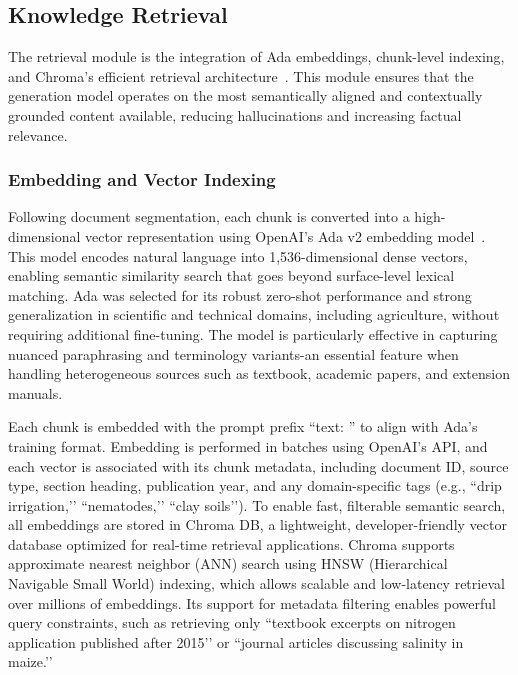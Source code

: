 \documentclass{ieeeaccess}
\begin{document}
\subsection{Knowledge Retrieval}

The retrieval module is the integration of Ada embeddings, chunk-level indexing, and Chroma’s efficient retrieval architecture~\cite{guu2020realm}. This module ensures that the generation model operates on the most semantically aligned and contextually grounded content available, reducing hallucinations and increasing factual relevance.

\subsubsection{Embedding and Vector Indexing}

Following document segmentation, each chunk is converted into a high-dimensional vector representation using OpenAI’s Ada v2 embedding model~\cite{guu2020realm}. This model encodes natural language into 1,536-dimensional dense vectors, enabling semantic similarity search that goes beyond surface-level lexical matching. Ada was selected for its robust zero-shot performance and strong generalization in scientific and technical domains, including agriculture, without requiring additional fine-tuning. The model is particularly effective in capturing nuanced paraphrasing and terminology variants-an essential feature when handling heterogeneous sources such as textbook, academic papers, and extension manuals.

Each chunk is embedded with the prompt prefix ``text: '' to align with Ada's training format. Embedding is performed in batches using OpenAI’s API, and each vector is associated with its chunk metadata, including document ID, source type, section heading, publication year, and any domain-specific tags (e.g., ``drip irrigation,’’ ``nematodes,’’ ``clay soils’’). To enable fast, filterable semantic search, all embeddings are stored in Chroma DB, a lightweight, developer-friendly vector database optimized for real-time retrieval applications. Chroma supports approximate nearest neighbor (ANN) search using HNSW (Hierarchical Navigable Small World) indexing, which allows scalable and low-latency retrieval over millions of embeddings. Its support for metadata filtering enables powerful query constraints, such as retrieving only ``textbook excerpts on nitrogen application published after 2015’’ or ``journal articles discussing salinity in maize.’’
\end{document}
